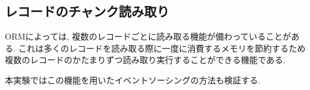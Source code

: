 \documentclass[../../../main]{subfiles}
\begin{document}
    \subsection{レコードのチャンク読み取り}\label{subsec:phraseology-record_chunk_read}

    ORMによっては, 複数のレコードごとに読み取る機能が備わっていることがある. これは多くのレコードを読み取る際に一度に消費するメモリを節約するため複数のレコードのかたまりずつ読み取り実行することができる機能である.\cite{FluentQuery}

    本実験ではこの機能を用いたイベントソーシングの方法も検証する.
\end{document}
